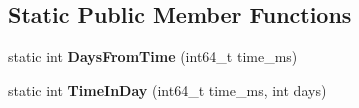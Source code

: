\subsection*{Static Public Member Functions}
\begin{DoxyCompactItemize}
\item 
\hypertarget{classv8_1_1internal_1_1_date_cache_aad8fb01f0a57bc43277def6da5993aae}{}static int {\bfseries Days\+From\+Time} (int64\+\_\+t time\+\_\+ms)\label{classv8_1_1internal_1_1_date_cache_aad8fb01f0a57bc43277def6da5993aae}

\item 
\hypertarget{classv8_1_1internal_1_1_date_cache_a3027a581b156086c088deca2a2a5f768}{}static int {\bfseries Time\+In\+Day} (int64\+\_\+t time\+\_\+ms, int days)\label{classv8_1_1internal_1_1_date_cache_a3027a581b156086c088deca2a2a5f768}

\end{DoxyCompactItemize}
